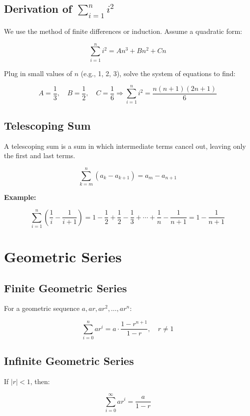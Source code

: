 \subsection{Derivation of \texorpdfstring{\(\sum_{i=1}^{n} i^2\)}{∑i²}}

We use the method of finite differences or induction. Assume a quadratic form:

\[
    \sum_{i=1}^{n} i^2 = An^3 + Bn^2 + Cn
\]

Plug in small values of \(n\) (e.g., 1, 2, 3), solve the system of equations to find:

\[
    A = \frac{1}{3}, \quad B = \frac{1}{2}, \quad C = \frac{1}{6}
    \Rightarrow \sum_{i = 1}^{n} i^2 = \frac{n(n+1)(2n+1)}{6}
\]

\subsection{Telescoping Sum}

A telescoping sum is a sum in which intermediate terms cancel out, leaving only the first and last terms.

\[
    \sum_{k=m}^{n} (a_k - a_{k+1}) = a_m - a_{n+1}
\]


\textbf{Example:}

\[
    \sum_{i=1}^{n} \left( \frac{1}{i} - \frac{1}{i+1} \right)
    = 1 - \frac{1}{2} + \frac{1}{2} - \frac{1}{3} + \cdots + \frac{1}{n} - \frac{1}{n+1}
    = 1 - \frac{1}{n+1}
\]

\section{Geometric Series}

\subsection{Finite Geometric Series}

For a geometric sequence \(a, ar, ar^2, \dots, ar^n\):

\[
    \sum_{i = 0}^{n} ar^i = a \cdot \frac{1 - r^{n + 1}}{1 - r}, \quad r \ne 1
\]

\subsection{Infinite Geometric Series}

If \(|r| < 1\), then:

\[
    \sum_{i = 0}^{\infty} ar^i = \frac{a}{1 - r}
\]

